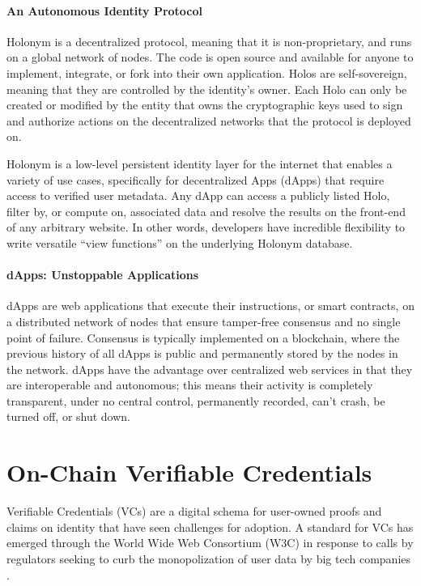 \documentclass[11pt,oneside,a4paper]{article}
\begin{document}
	\paragraph{An Autonomous Identity Protocol} Holonym is a decentralized protocol, meaning that it is non-proprietary, and runs on a global network of nodes. The code is open source and available for anyone to implement, integrate, or fork into their own application. Holos are self-sovereign, meaning that they are controlled by the identity’s owner. Each Holo can only be created or modified by the entity that owns the cryptographic keys used to sign and authorize actions on the decentralized networks that the protocol is deployed on.
	
	Holonym is a low-level persistent identity layer for the internet that enables a variety of use cases, specifically for decentralized Apps (dApps) that require access to verified user metadata. Any dApp can access a publicly listed Holo, filter by, or compute on, associated data and resolve the results on the front-end of any arbitrary website. In other words, developers have incredible flexibility to write versatile “view functions” on the underlying Holonym database.
	
	\paragraph{dApps: Unstoppable Applications} dApps are web applications that execute their instructions, or smart contracts, on a distributed network of nodes that ensure tamper-free consensus and no single point of failure. Consensus is typically implemented on a blockchain, where the previous history of all dApps is public and permanently stored by the nodes in the network. dApps have the advantage over centralized web services in that they are interoperable and autonomous; this means their activity is completely transparent, under no central control, permanently recorded, can’t crash, be turned off, or shut down.


	
\section*{On-Chain Verifiable Credentials}	
Verifiable Credentials (VCs) are a digital schema for user-owned proofs and claims on identity that have seen challenges for adoption. A standard for VCs has emerged through the World Wide Web Consortium (W3C) in response to calls by regulators seeking to curb the monopolization of user data by big tech companies \cite{w3c}. 
\end{document}
